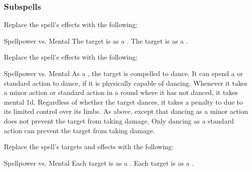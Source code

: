 \subsubsection{Subspells}
Replace the spell's effects with the following:
\begin{spellcontent}
\begin{augmenteffects}
\begin{spellattack}{Spellpower vs. Mental}
\spellsuccess The target is \disoriented as a .
\spellcritical The target is \confused as a .
\end{spellattack}
\end{augmenteffects}
\end{spellcontent}
Replace the spell's effects with the following:
\begin{spellcontent}
\begin{augmenteffects}
\begin{spellattack}{Spellpower vs. Mental}
\spellsuccess
As a , the target is compelled to dance.
It can spend a  or standard action to dance, if it is physically capable of dancing.
Whenever it takes a minor action or standard action in a round where it has not danced, it takes mental  \plus1d.
Regardless of whether the target dances, it takes a  penalty to  due to its limited control over its limbs.
\spellcritical
As above, except that dancing as a minor action does not prevent the target from taking damage.
Only dancing as a standard action can prevent the target from taking damage.
\end{spellattack}
\end{augmenteffects}
\end{spellcontent}
Replace the spell's targets and effects with the following:
\begin{spellcontent}
\begin{augmenttargetinginfo}
\end{augmenttargetinginfo}
\begin{augmenteffects}
\begin{spellattack}{Spellpower vs. Mental}
\spellsuccess Each target is \disoriented as a .
\spellcritical Each target is \confused as a .
\end{spellattack}
\end{augmenteffects}
\end{spellcontent}
